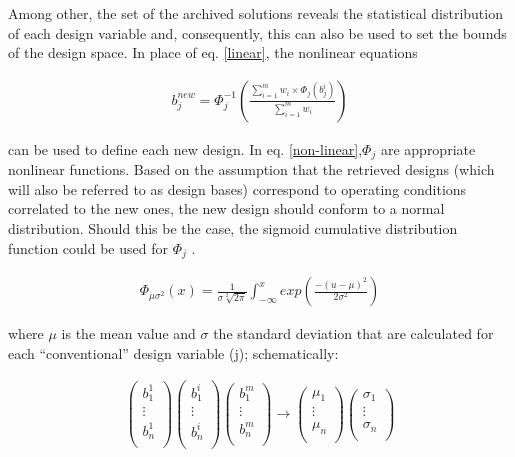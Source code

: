 Among other, the set of the archived solutions reveals the statistical distribution of each design variable and, consequently, this can also be used to set the bounds of the design space. In place of eq. \ref{linear}, the nonlinear equations

\begin{eqnarray}
   b_j^{new} = \Phi _j^{-1} (\frac{\sum_{i=1}^{m}w_i \times \Phi _j(b_j^i)}{\sum_{i=1}^{m}w_i }) 
   \label{non-linear} 
\end{eqnarray}

can be used to define each new design. In eq. \ref{non-linear},$\Phi _j$ are appropriate nonlinear functions. Based on the assumption that the retrieved designs (which will also be referred to as design bases) correspond to operating conditions correlated to the new ones, the new design should conform to a normal distribution. Should this be the case, the sigmoid cumulative distribution function could be used for $\Phi _j$  \cite{Kiemele}. 

\begin{eqnarray}
   \Phi _{\mu \sigma ^2} (x)= \frac{1}{\sigma\sqrt[2]{2\pi}}\int _{-\infty}^x exp(\frac{-(u-\mu)^2}{2 \sigma^2}) 
   \label{cdf} 
\end{eqnarray}

where $\mu$ is the mean value and $\sigma$ the standard deviation that are calculated for each “conventional” design variable (j); schematically:

\begin{eqnarray}
		\left( {\begin{array}{c}
 		b_1^1  \\
 		\vdots  \\
 		b_n^1	\\
 		\end{array} } \right) 
 		\left( {\begin{array}{c}
 		b_1^i  \\
 		\vdots  \\
 		b_n^i	\\
 		\end{array} } \right)
 		\left( {\begin{array}{c}
 		b_1^m  \\
 		\vdots  \\
 		b_n^m	\\
 		\end{array} } \right) \rightarrow
		\left( {\begin{array}{c}
 		\mu _1  \\
 		\vdots  \\
 		\mu _n  \\
 		\end{array} } \right)
		\left( {\begin{array}{c}
 		\sigma _1  \\
 		\vdots  \\
 		\sigma _n  \\
 		\end{array} } \right)
   \label{cdf-matrix} 
\end{eqnarray}

